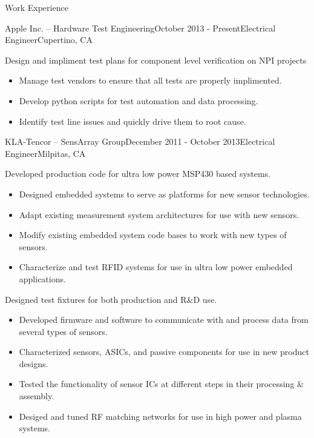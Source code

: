 \documentclass{resume} %
\begin{document}
\begin{rSection}{Work Experience}
\vspace{-0.5em}
\begin{rSubsection}{Apple Inc. -- Hardware Test Engineering}{October 2013 - Present}{Electrical Engineer}{Cupertino, CA}

\item Design and impliment test plans for component level verification on NPI projects
\begin{itemize}
\itemsep -0.5em \vspace{-0.5em}
\renewcommand{\labelitemi}{-}
\item Manage test vendors to ensure that all tests are properly implimented.
\item Develop python scripts for test automation and data processing.
\item Identify test line issues and quickly drive them to root cause.
\end{itemize}
\end{rSubsection}


\begin{rSubsection}{KLA-Tencor -- SensArray Group}{December 2011 - October 2013}{Electrical Engineer}{Milpitas, CA}

\item Developed production code for ultra low power MSP430 based systems.
\begin{itemize}
\itemsep -0.5em \vspace{-0.5em}
\renewcommand{\labelitemi}{-}
\item Designed embedded systems to serve as platforms for new sensor technologies.
\item Adapt existing measurement system architectures for use with new sensors.
\item Modify existing embedded system code bases to work with new types of sensors.
\item Characterize and test RFID systems for use in ultra low power embedded applications.
\end{itemize}

\item Designed test fixtures for both production and R\&D use.
\begin{itemize}
\itemsep -0.5em \vspace{-0.5em}
\renewcommand{\labelitemi}{-}
\item Developed firmware and software to communicate with and process data from several types of sensors.
\item Characterized sensors, ASICs, and passive components for use in new product designs.
\item Tested the functionality of sensor ICs at different steps in their processing \& assembly.
\item Desiged and tuned RF matching networks for use in high power and plasma systems.
\end{itemize}


\end{rSubsection}
\end{rSection}
\end{document}
